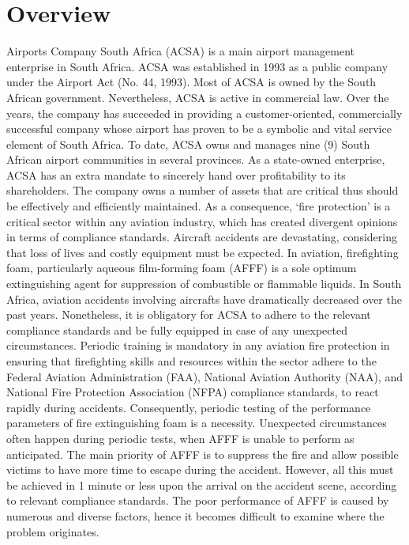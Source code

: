 \documentclass[12pt]{report}
\begin{document}
\section{Overview}
Airports Company South Africa (ACSA) is a main airport management enterprise in South Africa. ACSA was established in 1993 as a public company under the Airport Act (No. 44, 1993). Most of ACSA is owned by the South African government. Nevertheless, ACSA is active in commercial law. Over the years, the company has succeeded in providing a customer-oriented, commercially successful company whose airport has proven to be a symbolic and vital service element of South Africa. To date, ACSA owns and manages nine (9) South African airport communities in several provinces. As a state-owned enterprise, ACSA has an extra mandate to sincerely hand over profitability to its shareholders.
The company owns a number of assets that are critical thus should be effectively and efficiently maintained. As a consequence, ‘fire protection’ is a critical sector within any aviation industry, which has created divergent opinions in terms of compliance standards. Aircraft accidents are devastating, considering that loss of lives and costly equipment must be expected. In aviation, firefighting foam, particularly aqueous film-forming foam (AFFF) is a sole optimum extinguishing agent for suppression of combustible or flammable liquids. In South Africa, aviation accidents involving aircrafts have dramatically decreased over the past years. Nonetheless, it is obligatory for ACSA to adhere to the relevant compliance standards and be fully equipped in case of any unexpected circumstances.
Periodic training is mandatory in any aviation fire protection in ensuring that firefighting skills and resources within the sector adhere to the Federal Aviation Administration (FAA), National Aviation Authority (NAA), and National Fire Protection Association (NFPA) compliance standards, to react rapidly during accidents. Consequently, periodic testing of the performance parameters of fire extinguishing foam is a necessity. Unexpected circumstances often happen during periodic tests, when AFFF is unable to perform as anticipated. The main priority of AFFF is to suppress the fire and allow possible victims to have more time to escape during the accident. However, all this must be achieved in 1 minute or less upon the arrival on the accident scene, according to relevant compliance standards. The poor performance of AFFF is caused by numerous and diverse factors, hence it becomes difficult to examine where the problem originates.
\end{document}
